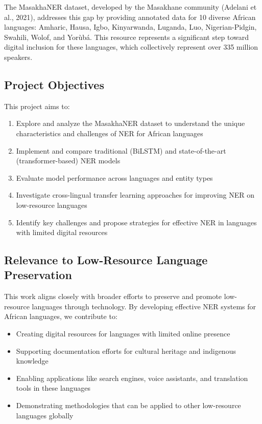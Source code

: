 \documentclass[
]{article}
\providecommand{\tightlist}{%
  \setlength{\itemsep}{0pt}\setlength{\parskip}{0pt}}\usepackage{longtable,booktabs,array}
\begin{document}
The MasakhaNER dataset, developed by the Masakhane community (Adelani et
al., 2021), addresses this gap by providing annotated data for 10
diverse African languages: Amharic, Hausa, Igbo, Kinyarwanda, Luganda,
Luo, Nigerian-Pidgin, Swahili, Wolof, and Yorùbá. This resource
represents a significant step toward digital inclusion for these
languages, which collectively represent over 335 million speakers.

\subsection{Project Objectives}\label{project-objectives}

This project aims to:

\begin{enumerate}
\def\labelenumi{\arabic{enumi}.}
\tightlist
\item
  Explore and analyze the MasakhaNER dataset to understand the unique
  characteristics and challenges of NER for African languages
\item
  Implement and compare traditional (BiLSTM) and state-of-the-art
  (transformer-based) NER models
\item
  Evaluate model performance across languages and entity types
\item
  Investigate cross-lingual transfer learning approaches for improving
  NER on low-resource languages
\item
  Identify key challenges and propose strategies for effective NER in
  languages with limited digital resources
\end{enumerate}

\subsection{Relevance to Low-Resource Language
Preservation}\label{relevance-to-low-resource-language-preservation}

This work aligns closely with broader efforts to preserve and promote
low-resource languages through technology. By developing effective NER
systems for African languages, we contribute to:

\begin{itemize}
\tightlist
\item
  Creating digital resources for languages with limited online presence
\item
  Supporting documentation efforts for cultural heritage and indigenous
  knowledge
\item
  Enabling applications like search engines, voice assistants, and
  translation tools in these languages
\item
  Demonstrating methodologies that can be applied to other low-resource
  languages globally
\end{itemize}
\end{document}
